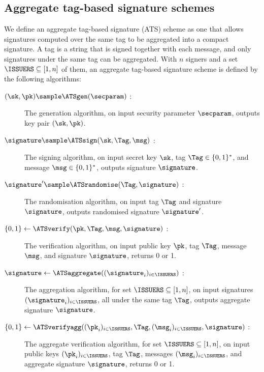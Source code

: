 \subsection{Aggregate tag-based signature schemes}

We define an aggregate tag-based signature (ATS) scheme as one that allows
signatures computed over the same tag to be aggregated into a compact signature.
A tag is a string that is signed together with each message, and only signatures
under the same tag can be aggregated. With $n$ signers and a set $\ISSUERS
\subseteq [1,n]$ of them, an aggregate tag-based signature scheme is defined by
the following algorithms:

\begin{description}

  \item[$(\sk, \pk) \sample \ATSgen(\secparam)$ :] The generation algorithm, on
input security parameter $\secparam$, outputs key pair $(\sk,\pk)$.

  \item[$\signature \sample \ATSsign(\sk, \Tag, \msg)$ :] The signing algorithm,
on input secret key $\sk$, tag $\Tag \in \{0,1\}^*$, and message $\msg \in
\{0,1\}^*$, outputs signature $\signature$.

  \item[$ \signature' \sample \ATSrandomise(\Tag, \signature)$ :] The
randomisation algorithm, on input tag $\Tag$ and signature $\signature$, outputs
randomised signature $\signature'$.

  \item[$ \{0,1\} \leftarrow \ATSverify(\pk, \Tag, \msg, \signature)$ :] The
verification algorithm, on input public key $\pk$, tag $\Tag$, message $\msg$,
and signature $\signature$, returns 0 or 1.

  \item[$\signature \leftarrow \ATSaggregate((\signature_i)_{i \in \ISSUERS})$
:] The aggregation algorithm, for set $\ISSUERS \subseteq [1, n]$, on input
signatures $(\signature_i)_{i \in \ISSUERS}$, all under the same tag $\Tag$,
outputs aggregate signature $\signature$.

  \item[$\{0,1\} \leftarrow \ATSverifyagg((\pk_i)_{i\in \ISSUERS}, \Tag,
(\msg_i)_{i\in \ISSUERS}, \signature)$ :] The aggregate verification algorithm,
for set $\ISSUERS \subseteq [1, n]$, on input public keys $(\pk_i)_{i\in
\ISSUERS}$, tag $\Tag$, messages $(\msg_i)_{i\in \ISSUERS}$, and aggregate
signature $\signature$, returns 0 or 1.

\end{description}

